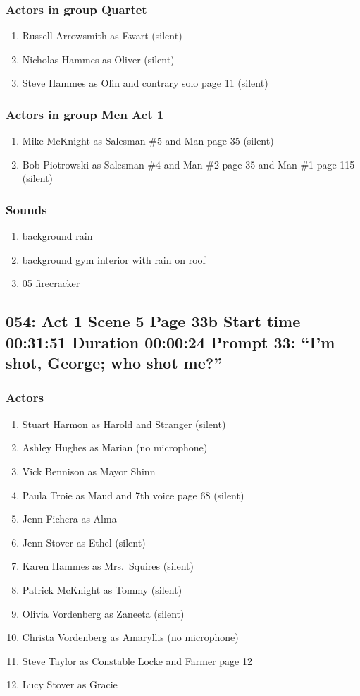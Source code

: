 \subsubsection{Actors in group Quartet}
\begin{enumerate}
\item Russell Arrowsmith as Ewart (silent)
\item Nicholas Hammes as Oliver (silent)
\item Steve Hammes as Olin and contrary solo page 11 (silent)
\end{enumerate}
\subsubsection{Actors in group Men Act 1}
\begin{enumerate}
\item Mike McKnight as Salesman \#5 and Man page 35 (silent)
\item Bob Piotrowski as Salesman \#4 and Man \#2 page 35 and Man \#1 page 115 (silent)
\end{enumerate}

\subsubsection{Sounds}
\begin{enumerate}
\item background rain
\item background gym interior with rain on roof
\item 05 firecracker
\end{enumerate}
\subsection{054: Act 1 Scene 5 Page 33b Start time 00:31:51 Duration 00:00:24 Prompt 33: ``I'm shot, George; who shot me?''}

\subsubsection{Actors}
\begin{enumerate}
\item Stuart Harmon as Harold and Stranger (silent)
\item Ashley Hughes as Marian (no microphone)
\item Vick Bennison as Mayor Shinn
\item Paula Troie as Maud and 7th voice page 68 (silent)
\item Jenn Fichera as Alma
\item Jenn Stover as Ethel (silent)
\item Karen Hammes as Mrs.~Squires (silent)
\item Patrick McKnight as Tommy (silent)
\item Olivia Vordenberg as Zaneeta (silent)
\item Christa Vordenberg as Amaryllis (no microphone)
\item Steve Taylor as Constable Locke and Farmer page 12
\item Lucy Stover as Gracie
\end{enumerate}
